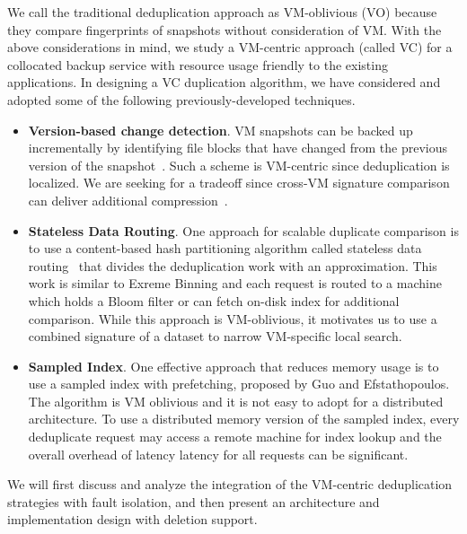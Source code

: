 We call the traditional deduplication approach as   VM-oblivious (VO)
because they compare fingerprints of snapshots without consideration of VM.
With the above  considerations in mind, we study a 
VM-centric approach (called VC)
for a collocated backup service with resource usage friendly
to the existing applications.  
In designing a VC duplication algorithm, we have considered and adopted some of
the following previously-developed techniques.
\begin{itemize}
\item {\bf Version-based change detection}.
VM snapshots can be  backed up  incrementally by identifying file  blocks that have
changed from the previous version of the snapshot~\cite{Clements2009,Vrable2009,TanIPDPS2011}.
Such a scheme  is  VM-centric since deduplication is localized. 
We are seeking for a tradeoff since 
cross-VM  signature comparison can deliver additional compression~\cite{Guo2011,Dong2011,extreme_binning09}.
\item {\bf Stateless  Data Routing}.
One approach for scalable duplicate comparison is to use a content-based hash
partitioning algorithm called stateless data routing~\cite{Dong2011}
that divides the deduplication work with an approximation. This work 
is similar to Exreme Binning\cite{extreme_binning09} and 
each request is routed  to a machine which holds
a Bloom filter  or can fetch on-disk index for additional comparison.
While this approach is VM-oblivious, it motivates us to  use  a combined signature of a dataset to narrow
VM-specific local search.
\item {\bf Sampled Index}.
One effective approach that reduces memory usage is 
to use a sampled index with prefetching, proposed  by Guo and Efstathopoulos\cite{Guo2011}. 
The algorithm is VM oblivious and it is not easy  to adopt for a distributed architecture. 
To use a distributed memory version of the sampled index, every deduplicate request
may access a remote machine for index lookup and the overall overhead of latency latency for all requests
can be significant.  
\end{itemize}

We will first discuss and analyze the integration of the VM-centric deduplication strategies with fault isolation, 
and then present
an architecture and implementation design with deletion support.
